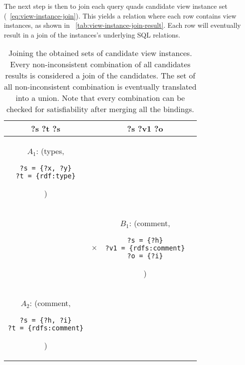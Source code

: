 \documentclass[a4paper,twoside,bibtotoc,abstracton,12pt,BCOR=15mm]{scrreprt}
\begin{document}
The next step is then to join each query quads candidate view instance set (~\autoref{eq:view-instance-join}). This yields a relation where each row contains view instances,
as shown in ~\autoref{tab:view-instance-join-result}.
Each row will eventually result in a join of the instances's underlying SQL relations.



\begin{table}[!h]
\centering
\begin{tabular}{cccc}
\toprule
\textbf{?s ?t ?s} & & \textbf{?s ?v1 ?o} \\
\midrule

$A_1$: (types,
\begin{minipage}{3cm}
\begin{scriptsize}
\begin{verbatim}
?s = {?x, ?y}
?t = {rdf:type}
\end{verbatim}
\end{scriptsize}
\end{minipage}
)

&
&


\\

&
$\times$
&

$B_1$: (comment,
\begin{minipage}{3cm}
\begin{scriptsize}
\begin{verbatim}
?s = {?h}
?v1 = {rdfs:comment}
?o = {?i}
\end{verbatim}
\end{scriptsize}
\end{minipage}
)


\\

$A_2$: (comment,
\begin{minipage}{3cm}
\begin{scriptsize}
\begin{verbatim}
?s = {?h, ?i}
?t = {rdfs:comment}
\end{verbatim}
\end{scriptsize}
\end{minipage}
)

& 
&


\\
\bottomrule
\end{tabular}
\caption{Joining the obtained sets of candidate view instances. Every non-inconsistent combination of all candidates results is considered a join of the candidates. The set of all non-inconsistent combination is eventually translated into a union. Note that every combination can be checked for satisfiability after merging all the bindings.}
\label{tab:view-instance-join}
\end{table}
\end{document}
